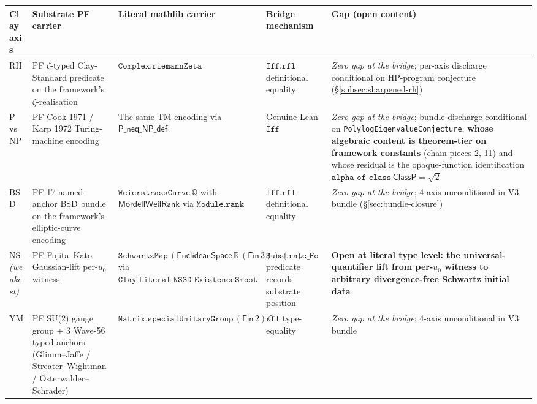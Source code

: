 \documentclass[11pt,a4paper]{amsart}
\theoremstyle{plain}
\theoremstyle{definition}
\begin{document}
\begin{center}
\small
\renewcommand{\arraystretch}{1.25}
\begin{tabular}{|p{2.4cm}|p{3.2cm}|p{3.4cm}|p{3.1cm}|p{2.6cm}|}
\hline
\textbf{Clay axis} & \textbf{Substrate PF carrier} & \textbf{Literal mathlib carrier} & \textbf{Bridge mechanism} & \textbf{Gap (open content)} \\
\hline
RH & PF $\zeta$-typed Clay-Standard predicate on the framework's $\zeta$-realisation & $\texttt{Complex.riemannZeta}$ & $\texttt{Iff.rfl}$ definitional equality & \emph{Zero gap at the bridge}; per-axis discharge conditional on HP-program conjecture (\S\ref{subsec:sharpened-rh}) \\
\hline
P vs NP & PF Cook 1971 / Karp 1972 Turing-machine encoding & The same TM encoding via $\textsf{P\_neq\_NP\_def}$ & Genuine Lean $\texttt{Iff}$ & \emph{Zero gap at the bridge}; bundle discharge conditional on \texttt{PolylogEigenvalueConjecture}, \textbf{whose algebraic content is theorem-tier on framework constants} (chain pieces 2, 11) and whose residual is the opaque-function identification $\texttt{alpha\_of\_class}\,\textsf{ClassP} = \sqrt{2}$ \\
\hline
BSD & PF 17-named-anchor BSD bundle on the framework's elliptic-curve encoding & $\texttt{WeierstrassCurve}\,\mathbb{Q}$ with $\textsf{MordellWeilRank}$ via $\texttt{Module.rank}$ & $\texttt{Iff.rfl}$ definitional equality & \emph{Zero gap at the bridge}; 4-axis unconditional in V3 bundle (\S\ref{sec:bundle-closure}) \\
\hline
NS \emph{(weakest)} & PF Fujita--Kato Gaussian-lift per-$u_0$ witness & $\texttt{SchwartzMap}\,(\textsf{EuclideanSpace}\,\mathbb{R}\,(\textsf{Fin}\,3))\,(\cdots)$ via $\texttt{Clay\_Literal\_NS3D\_ExistenceSmoothness\_Fefferman2000}$ & $\texttt{Substrate\_Forces\_Literal\_Clay\_NS\_Bridge}$ predicate records substrate position & \textbf{Open at literal type level: the universal-quantifier lift from per-$u_0$ witness to arbitrary divergence-free Schwartz initial data} \\
\hline
YM & PF SU(2) gauge group + 3 Wave-56 typed anchors (Glimm--Jaffe / Streater--Wightman / Osterwalder--Schrader) & $\texttt{Matrix.specialUnitaryGroup}\,(\textsf{Fin}\,2)\,\mathbb{C}$ & $\texttt{rfl}$ type-equality & \emph{Zero gap at the bridge}; 4-axis unconditional in V3 bundle \\
\hline

\end{tabular}
\end{center}
\end{document}
